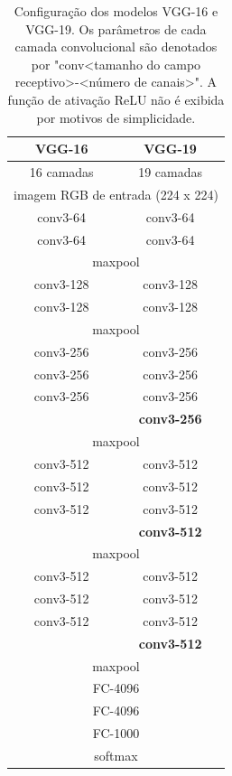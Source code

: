 \begin{table}[h]
    \centering
    \footnotesize
    \begin{tabular}{|c|c|}
        \hline
        \textbf{VGG-16} & \textbf{VGG-19} \\
        \hline
        16 camadas & 19 camadas \\
        \hline
        \multicolumn{2}{|c|}{imagem RGB de entrada (224 x 224)} \\
        \hline
        conv3-64 & conv3-64 \\
        conv3-64 & conv3-64 \\
        \hline
        \multicolumn{2}{|c|}{maxpool} \\
        \hline
        conv3-128 & conv3-128 \\
        conv3-128 & conv3-128 \\
        \hline
        \multicolumn{2}{|c|}{maxpool} \\
        \hline
        conv3-256 & conv3-256 \\
        conv3-256 & conv3-256 \\
        conv3-256 & conv3-256 \\
         & \textbf{conv3-256} \\
        \hline
        \multicolumn{2}{|c|}{maxpool} \\
        \hline
        conv3-512 & conv3-512 \\
        conv3-512 & conv3-512 \\
        conv3-512 & conv3-512 \\
         & \textbf{conv3-512} \\
        \hline
        \multicolumn{2}{|c|}{maxpool} \\
        \hline
        conv3-512 & conv3-512 \\
        conv3-512 & conv3-512 \\
        conv3-512 & conv3-512 \\
         & \textbf{conv3-512} \\
        \hline
        \multicolumn{2}{|c|}{maxpool} \\
        \hline
        \multicolumn{2}{|c|}{FC-4096} \\
        \hline
        \multicolumn{2}{|c|}{FC-4096} \\
        \hline
        \multicolumn{2}{|c|}{FC-1000} \\
        \hline
        \multicolumn{2}{|c|}{softmax} \\
        \hline
    \end{tabular}
    \caption{Configuração dos modelos VGG-16 e VGG-19. Os parâmetros de cada camada convolucional são denotados por "conv<tamanho do campo receptivo>-<número de canais>". A função de ativação ReLU não é exibida por motivos de simplicidade.}
    \label{vgg-arch}
\end{table}

